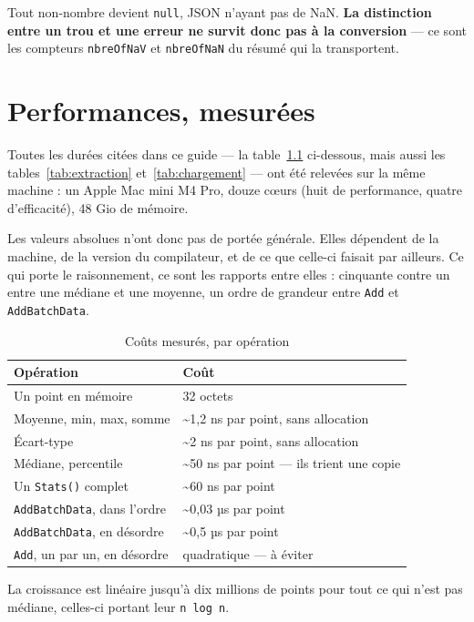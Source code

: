 \documentclass[11pt,a4paper]{report}
\begin{document}
Tout non-nombre devient \texttt{null}, JSON n'ayant pas de NaN.
\textbf{La distinction entre un trou et une erreur ne survit donc pas à
la conversion} --- ce sont les compteurs \texttt{nbreOfNaV} et
\texttt{nbreOfNaN} du résumé qui la transportent.

\chapter{Performances, mesurées}\label{chap:performances}

Toutes les durées citées dans ce guide --- la table~\ref{tab:performances}
ci-dessous, mais aussi les tables~\ref{tab:extraction}
et~\ref{tab:chargement} --- ont été relevées sur la même machine : un
Apple Mac mini M4 Pro, douze cœurs (huit de performance, quatre
d'efficacité), 48 Gio de mémoire.

Les valeurs absolues n'ont donc pas de portée générale. Elles dépendent
de la machine, de la version du compilateur, et de ce que celle-ci
faisait par ailleurs. Ce qui porte le raisonnement, ce sont les rapports
entre elles : cinquante contre un entre une médiane et une moyenne, un
ordre de grandeur entre \texttt{Add} et \texttt{AddBatchData}.

\begin{longtable}[]{@{}ll@{}}
\caption{Coûts mesurés, par opération}\label{tab:performances}\\
\toprule\noalign{}
Opération & Coût \\
\midrule\noalign{}
\endhead
\bottomrule\noalign{}
\endlastfoot
Un point en mémoire & 32 octets \\
Moyenne, min, max, somme & \textasciitilde1,2 ns par point, sans
allocation \\
Écart-type & \textasciitilde2 ns par point, sans allocation \\
Médiane, percentile & \textasciitilde50 ns par point --- ils trient une
copie \\
Un \texttt{Stats()} complet & \textasciitilde60 ns par point \\
\texttt{AddBatchData}, dans l'ordre & \textasciitilde0,03 µs par
point \\
\texttt{AddBatchData}, en désordre & \textasciitilde0,5 µs par point \\
\texttt{Add}, un par un, en désordre & quadratique --- à éviter \\
\end{longtable}

La croissance est linéaire jusqu'à dix millions de points pour tout ce
qui n'est pas médiane, celles-ci portant leur \texttt{n\ log\ n}.
\end{document}
